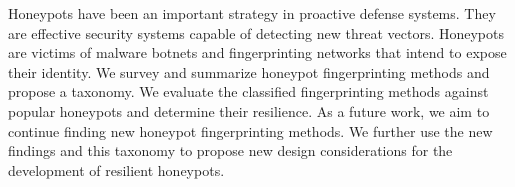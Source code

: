 \documentclass[../main.tex]{subfiles}
\begin{document}
Honeypots have been an important strategy in proactive defense systems. They are effective security systems capable of detecting new threat vectors. Honeypots are victims of malware botnets and fingerprinting networks that intend to expose their identity.  We survey and summarize honeypot fingerprinting methods and propose a taxonomy. We evaluate the classified fingerprinting methods against popular honeypots and determine their resilience. As a future work, we aim to continue finding new honeypot fingerprinting methods. We further use the new findings and this taxonomy to propose new design considerations for the development of resilient honeypots. 
\end{document}
